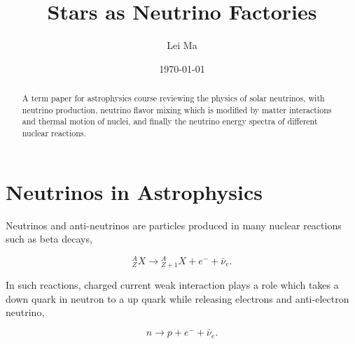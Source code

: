\documentclass[%
 aip,
 jmp,%
 amsmath,amssymb,
 reprint,%
]{revtex4-1}
\begin{document}
\preprint{}

\title[Stars as Neutrino Factories]{Stars as Neutrino Factories}%

\author{Lei Ma}
%


\date{\today}%
\begin{abstract}
A term paper for astrophysics course reviewing the physics of solar neutrinos, with neutrino production, neutrino flavor mixing which is modified by matter interactions and thermal motion of nuclei, and finally the neutrino energy spectra of different nuclear reactions.
\end{abstract}


\maketitle


\section{\label{sec:neutrinos_in_astrophysics}Neutrinos in Astrophysics}


Neutrinos and anti-neutrinos are particles produced in many nuclear reactions such as beta decays,

\begin{equation}
{}^A_Z X \to {}_{Z+1}^AX + e^- +\bar \nu_e .
\end{equation}

In such reactions, charged current weak interaction plays a role which takes a down quark in neutron to a up quark while releasing electrons and anti-electron neutrino,

\begin{equation}
n\to p + e^- + \bar \nu_e .
\end{equation}
\end{document}
